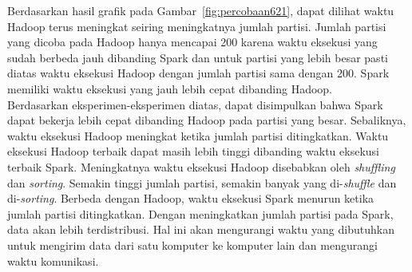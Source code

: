 Berdasarkan hasil grafik pada Gambar~\ref{fig:percobaan621}, dapat dilihat waktu Hadoop terus meningkat seiring meningkatnya jumlah partisi. Jumlah partisi yang dicoba pada Hadoop hanya mencapai 200 karena waktu eksekusi yang sudah berbeda jauh dibanding Spark dan untuk partisi yang lebih besar pasti diatas waktu eksekusi Hadoop dengan jumlah partisi sama dengan 200. Spark memiliki waktu eksekusi yang jauh lebih cepat dibanding Hadoop. \\


Berdasarkan eksperimen-eksperimen diatas, dapat disimpulkan bahwa Spark dapat bekerja lebih cepat dibanding Hadoop pada partisi yang besar. Sebaliknya, waktu eksekusi Hadoop meningkat ketika jumlah partisi ditingkatkan. Waktu eksekusi Hadoop terbaik dapat masih lebih tinggi dibanding waktu eksekusi terbaik Spark. Meningkatnya waktu eksekusi Hadoop disebabkan oleh \textit{shuffling} dan \textit{sorting}. Semakin tinggi jumlah partisi, semakin banyak yang di-\textit{shuffle} dan di-\textit{sorting}. Berbeda dengan Hadoop, waktu eksekusi Spark menurun ketika jumlah partisi ditingkatkan. Dengan meningkatkan jumlah partisi pada Spark, data akan lebih terdistribusi. Hal ini akan mengurangi waktu yang dibutuhkan untuk mengirim data dari satu komputer ke komputer lain dan mengurangi waktu komunikasi.